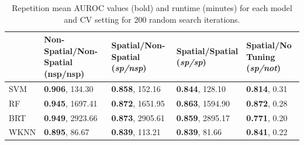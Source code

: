 

\begin{table}[b!]
	\centering
	\caption[]{Repetition mean \ac{AUROC} values (bold) and runtime (minutes) for each model and \ac{CV} setting for 200 random search iterations.}
	\begingroup\footnotesize
	\begin{tabular}{lllll}
		\\
		          & \specialcell{Non-Spatial/Non-Spatial \\ {(nsp/nsp)}} & \specialcell{Spatial/Non-Spatial \\ {(\emph{sp/nsp})}} & \specialcell{Spatial/Spatial \\ {(\emph{sp/sp})}} & \specialcell{Spatial/No Tuning \\ {(\emph{sp/not})}} \\
		\hline
		\ac{SVM}  & \textbf{0.906}, 134.30                               & \textbf{0.858}, 152.16                                 & \textbf{0.844}, 128.10                            & \textbf{0.814}, 0.31                                 \\
		\ac{RF}   & \textbf{0.945}, 1697.41                              & \textbf{0.872}, 1651.95                                & \textbf{0.863}, 1594.90                           & \textbf{0.872}, 0.28                                 \\
		\ac{BRT}  & \textbf{0.949}, 2923.66                              & \textbf{0.873}, 2905.61                                & \textbf{0.859}, 2895.17                           & \textbf{0.771}, 0.20                                 \\
		\ac{WKNN} & \textbf{0.895}, 86.67                                & \textbf{0.839}, 113.21                                 & \textbf{0.839}, 81.66                             & \textbf{0.841}, 0.22                                 \\
		\bottomrule
	\end{tabular}
	\endgroup
	\label{tab:cv_results}
\end{table}
